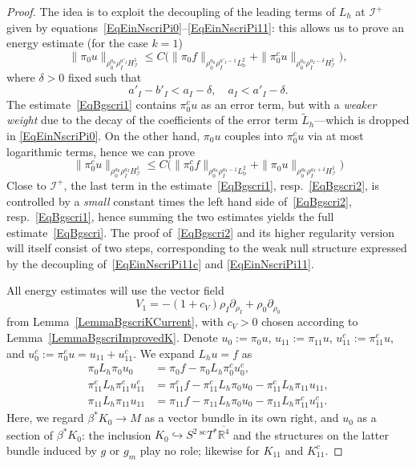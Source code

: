 \documentclass[reqno,11pt,letterpaper]{amsart}
\numberwithin{equation}{section}
\numberwithin{figure}{section}
\theoremstyle{definition}
\theoremstyle{remark}
\newcommand{\ms}{\mathscr}
\newcommand{\scri}{\ms I}
\newcommand{\R}{\mathbb{R}}
\newcommand{\hra}{\hookrightarrow}
\newcommand{\ol}{\overline}
\newcommand{\pa}{\partial}
\newcommand{\wt}{\widetilde}
\newcommand{\bop}{{\mathrm{b}}}
\newcommand{\scl}{{\mathrm{sc}}}
\newcommand{\Tsc}{{}^{\scl}T}
\newcommand{\Hscri}{H_{\scri}}
\begin{document}
\begin{proof}
  The idea is to exploit the decoupling of the leading terms of $L_h$ at $\scri^+$ given by equations~\eqref{EqEinNscriPi0}--\eqref{EqEinNscriPi11}: this allows us to prove an energy estimate (for the case $k=1$)
  \begin{equation}
  \label{EqBgscri1}
    \|\pi_0 u\|_{\rho_0^{a_0}\rho_I^{a'_I}\Hscri^1} \leq C\bigl( \|\pi_0 f\|_{\rho_0^{a_0}\rho_I^{a'_I-1}L^2_\bop} + \|\pi_0^c u\|_{\rho_0^{a_0}\rho_I^{a_I-\delta}\Hscri^1}\bigr),
  \end{equation}
  where $\delta>0$ fixed such that
  \begin{equation}
  \label{EqBgscriDelta}
    a'_I-b'_I<a_I-\delta,\quad
    a_I<a'_I-\delta.
  \end{equation}
  The estimate~\eqref{EqBgscri1} contains $\pi_0^c u$ as an error term, but with a \emph{weaker weight} due to the decay of the coefficients of the error term $\wt L_h$---which is dropped in \eqref{EqEinNscriPi0}. On the other hand, $\pi_0 u$ couples into $\pi_0^c u$ via at most logarithmic terms, hence we can prove
  \begin{equation}
  \label{EqBgscri2}
    \|\pi_0^c u\|_{\rho_0^{a_0}\rho_I^{a_I}\Hscri^1} \leq C\bigl( \|\pi_0^c f\|_{\rho_0^{a_0}\rho_I^{a_I-1}L^2_\bop} + \|\pi_0 u\|_{\rho_0^{a_0}\rho_I^{a_I+\delta}\Hscri^1}\bigr)
  \end{equation}
  Close to $\scri^+$, the last term in the estimate~\eqref{EqBgscri1}, resp.\ \eqref{EqBgscri2}, is controlled by a \emph{small} constant times the left hand side of~\eqref{EqBgscri2}, resp.\ \eqref{EqBgscri1}, hence summing the two estimates yields the full estimate~\eqref{EqBgscri}. The proof of~\eqref{EqBgscri2} and its higher regularity version will itself consist of two steps, corresponding to the weak null structure expressed by the decoupling of~\eqref{EqEinNscriPi11c} and \eqref{EqEinNscriPi11}.

  All energy estimates will use the vector field
  \[
    V_1=-(1+c_V)\rho_I\pa_{\rho_I}+\rho_0\pa_{\rho_0}
  \]
  from Lemma~\ref{LemmaBgscriKCurrent}, with $c_V>0$ chosen according to Lemma~\ref{LemmaBgscriImprovedK}. Denote $u_0:=\pi_0 u$, $u_{1 1}:=\pi_{1 1}u$, $u_{1 1}^c:=\pi_{1 1}^c u$, and $u_0^c:=\pi_0^c u=u_{1 1}+u_{1 1}^c$. We expand $L_h u=f$ as
  \begin{subequations}
  \begin{align}
  \label{EqBgscriEq0}
    \pi_0 L_h\pi_0 u_0 &= \pi_0 f - \pi_0 L_h\pi_0^c u_0^c , \\
  \label{EqBgscriEq11c}
    \pi_{1 1}^c L_h\pi_{1 1}^c u_{1 1}^c &= \pi_{1 1}^c f - \pi_{1 1}^c L_h\pi_0 u_0 - \pi_{1 1}^c L_h\pi_{1 1} u_{1 1} , \\
  \label{EqBgscriEq11}
    \pi_{1 1}L_h\pi_{1 1} u_{1 1} &= \pi_{1 1}f - \pi_{1 1}L_h\pi_0 u_0 - \pi_{1 1}L_h\pi_{1 1}^c u_{1 1}^c .
  \end{align}
  \end{subequations}
  Here, we regard $\beta^*K_0\to M$ as a vector bundle in its own right, and $u_0$ as a section of $\beta^*K_0$: the inclusion $K_0\hra S^2\,\Tsc^*\ol{\R^4}$ and the structures on the latter bundle induced by $g$ or $g_m$ play no role; likewise for $K_{1 1}$ and $K_{1 1}^c$.
  

\end{proof}
\end{document}
